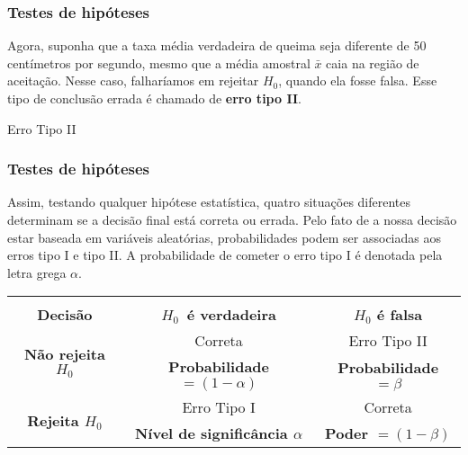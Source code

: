 \documentclass[14pt,aspectratio=1610]{beamer}
\begin{document}
\begin{frame}{}
\frametitle{Testes de hipóteses}
\begin{block}{}
\justifying
Agora, suponha que a taxa média verdadeira de queima seja diferente de 50 centímetros por segundo, mesmo que a média amostral $\bar{x}$ caia na região de 
aceitação. Nesse caso, falharíamos em rejeitar $H_{0}$, quando ela fosse falsa. Esse tipo de conclusão errada é chamado de \textbf{erro tipo II}.
\end{block}
\pause
\small
\begin{block}{Erro Tipo II}
\end{block}
\end{frame}

\begin{frame}{}
\frametitle{Testes de hipóteses}
\vspace{-0.5cm}
\small
\begin{block}{}
\justifying
Assim, testando qualquer hipótese estatística, quatro situações diferentes determinam se a decisão final está correta ou errada. Pelo fato de a nossa decisão estar 
baseada em variáveis aleatórias, probabilidades podem ser associadas aos erros tipo I e tipo II. A probabilidade de cometer o erro tipo I é denotada pela letra grega 
$\alpha$.
 \end{block}
\vspace{-1.5cm}
\begin{block}{}
\begin{center}
\begin{table}[]
\begin{tabular}{c|c|c}
&&\\
                          \textbf{Decisão}                   &\textbf{$H_{0}\,$ é verdadeira}                         &\textbf{$H_{0}$ é falsa}\\ \hline
 \multirow{2}{*}{\textbf{Não rejeita $H_{0}$}}&Correta                                                               &Erro Tipo II\\
                                                                        &\textbf{Probabilidade $=\left(1-\alpha \right)$} &\textbf{Probabilidade $=\beta$}\\ \hline
\multirow{2}{*}{\textbf{Rejeita $H_{0}$}}       &Erro Tipo I                                                          &  Correta\\
                                                                        &\textbf{Nível de significância $\alpha$}            &\textbf{Poder $=\left( 1-\beta\right)$}\\ \hline
\end{tabular}
\end{table}
\end{center}
\end{block}

\end{frame}
\end{document}
